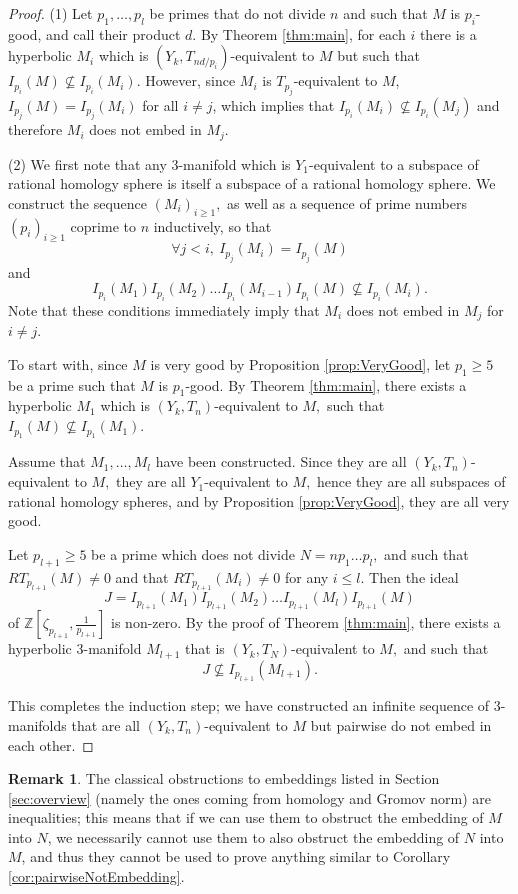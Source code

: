 \documentclass[12pt]{amsart}
\theoremstyle{definition}
\newtheorem{rem}[thm]{Remark}
\newcommand{\Z}{\mathbb{Z}}
\begin{document}
\begin{proof}
	(1) Let $p_1,\dots, p_l$ be primes that do not divide $n$ and such that $M$ is $p_i$-good, and call their product $d$.  By Theorem \ref{thm:main}, for each $i$ there is a hyperbolic $M_i$ which is $(Y_k,T_{nd/p_i})$-equivalent to $M$ but such that $I_{p_i}(M)\nsubseteq I_{p_i}(M_i)$. However, since $M_i$ is $T_{p_j}$-equivalent to $M$, $I_{p_j}(M)=I_{p_j}(M_i)$ for all $i\neq j$, which implies that $I_{p_i}(M_i)\nsubseteq I_{p_i}(M_j)$ and therefore $M_i$ does not embed in $M_j$.
	
	(2) We first note that any $3$-manifold which is $Y_1$-equivalent to a subspace of rational homology sphere is itself a subspace of a rational homology sphere. We construct the sequence $(M_i)_{i\geq 1},$ as well as a sequence of prime numbers $(p_i)_{i\geq 1}$ coprime to $n$ inductively, so that 
	\[\forall j<i, \ I_{p_j}(M_i)=I_{p_j}(M)\]
	and
	\[ I_{p_i}(M_1)I_{p_i}(M_2)\ldots I_{p_i}(M_{i-1})I_{p_i}(M) \nsubseteq I_{p_i}(M_i).\]
	Note that these conditions immediately imply that $M_i$ does not embed in $M_j$ for $i\neq j.$
	
	
	To start with, since $M$ is very good by Proposition \ref{prop:VeryGood}, let $p_1\geq 5$ be a prime such that $M$ is $p_1$-good. By Theorem \ref{thm:main}, there exists a hyperbolic $M_1$ which is $(Y_k,T_n)$-equivalent to $M,$ such that $I_{p_1}(M)\nsubseteq I_{p_1}(M_1).$
	
	 Assume that $M_1,\ldots, M_l$ have been constructed. Since they are all $(Y_k,T_n)$-equivalent to $M,$ they are all $Y_1$-equivalent to $M,$ hence they are all subspaces of rational homology spheres, and by Proposition \ref{prop:VeryGood}, they are all very good.
	
	Let $p_{l+1}\geq 5$ be a prime which does not divide $N=np_1\ldots p_l,$ and such that $RT_{p_{l+1}}(M)\neq 0$ and that $RT_{p_{l+1}}(M_i)\neq 0$ for any $i\leq l.$ Then the ideal 
	$$J=I_{p_{l+1}}(M_1)I_{p_{l+1}}(M_2)\ldots I_{p_{l+1}}(M_{l})I_{p_{l+1}}(M)$$ of $\Z[\zeta_{p_{l+1}},\frac{1}{p_{l+1}}]$ is non-zero. By the proof of Theorem \ref{thm:main}, there exists a hyperbolic $3$-manifold $M_{l+1}$ that is $(Y_k,T_N)$-equivalent to $M,$ and such that
	$$J\nsubseteq I_{p_{l+1}}(M_{l+1}).$$
	
	This completes the induction step; we have constructed an infinite sequence of $3$-manifolds that are all $(Y_k,T_n)$-equivalent to $M$ but pairwise do not embed in each other.
\end{proof}

\begin{rem}
	The classical obstructions to embeddings listed in Section \ref{sec:overview} (namely the ones coming from homology and Gromov norm) are inequalities; this means that if we can use them to obstruct the embedding of $M$ into $N$, we necessarily cannot use them to also obstruct the embedding of $N$ into $M$, and thus they cannot be used to prove anything similar to Corollary \ref{cor:pairwiseNotEmbedding}.
\end{rem}
\end{document}
